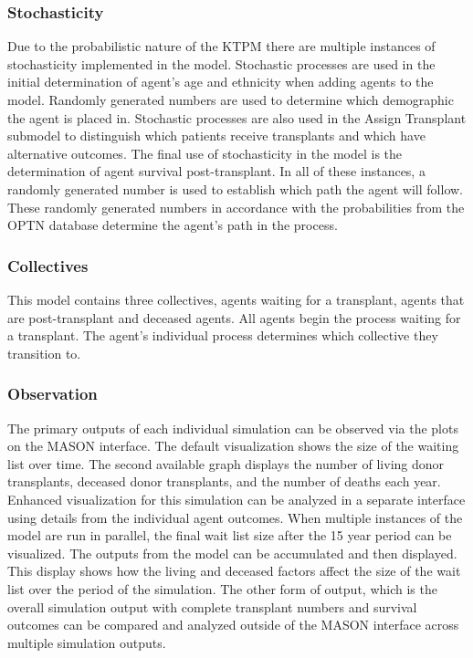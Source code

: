 \documentclass[9pt,a4paper,twocolumn]{scrartcl}
\begin{document}
\subsubsection{Stochasticity}
Due to the probabilistic nature of the KTPM there are multiple instances of stochasticity implemented in the model.  Stochastic processes are used in the initial determination of agent’s age and ethnicity when adding agents to the model.  Randomly generated numbers are used to determine which demographic the agent is placed in.  Stochastic processes are also used in the Assign Transplant submodel to distinguish which patients receive transplants and which have alternative outcomes.  The final use of stochasticity in the model is the determination of agent survival post-transplant.  In all of these instances, a randomly generated number is used to establish which path the agent will follow.  These randomly generated numbers in accordance with the probabilities from the OPTN database determine the agent’s path in the process.

\subsubsection{Collectives}
This model contains three collectives, agents waiting for a transplant, agents that are post-transplant and deceased agents.  All agents begin the process waiting for a transplant.  The agent’s individual process determines which collective they transition to.  

\subsubsection{Observation}
The primary outputs of each individual simulation can be observed via the plots on the MASON interface.  The default visualization shows the size of the waiting list over time.  The second available graph displays the number of living donor transplants, deceased donor transplants, and the number of deaths each year.  Enhanced visualization for this simulation can be analyzed in a separate interface using details from the individual agent outcomes.
When multiple instances of the model are run in parallel, the final wait list size after the 15 year period can be visualized.  The outputs from the model can be accumulated and then displayed.  This display shows how the living and deceased factors affect the size of the wait list over the period of the simulation.
The other form of output, which is the overall simulation output with complete transplant numbers and survival outcomes can be compared and analyzed outside of the MASON interface across multiple simulation outputs.
\end{document}
